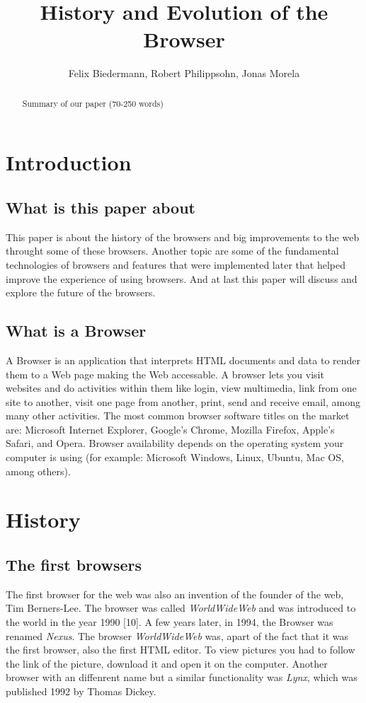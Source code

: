 \documentclass[runningheads]{llncs}
\title{History and Evolution of the Browser}
\author{Felix Biedermann, Robert Philippsohn, Jonas Morela}
\institute{University of Stuttgart, Institute for Architecture of Application Systems \\
Universitätsstraße 38, 70569 Stuttgart, Germany}
\begin{document}
\raggedbottom
\maketitle

	\begin{abstract}
		Summary of our paper (70-250 words)
	\end{abstract}

	\section{Introduction}
		\subsection{What is this paper about}
		This paper is about the history of the browsers and big improvements to the web throught some of these browsers. Another topic are some of the fundamental technologies of browsers and features that were implemented later that helped improve the experience of using browsers. And at last this paper will discuss and explore the future of the browsers.
		\subsection{What is a Browser}
		A Browser is an application that interprets HTML documents and data to render them to a Web page making the Web accessable. A browser lets you visit websites and do activities within them like login, view multimedia, link from one site to another, visit one page from another, print, send and receive email, among many other activities. The most common browser software titles on the market are: Microsoft Internet Explorer, Google's Chrome, Mozilla Firefox, Apple's Safari, and Opera. Browser availability depends on the operating system your computer is using (for example: Microsoft Windows, Linux, Ubuntu, Mac OS, among others).

	\section{History}
		\subsection{The first browsers}
		The first browser for the web was also an invention of the founder of the web, Tim Berners-Lee. The browser was called \textit{WorldWideWeb} and was introduced to the world in the year 1990 [10]. A few years later, in 1994, the Browser was renamed \textit{Nexus}. The browser \textit{WorldWideWeb} was, apart of the fact that it was the first browser, also the first HTML editor.
		To view pictures you had to follow the link of the picture, download it and open it on the computer. Another browser with an diffenrent name but a similar functionality was \textit{Lynx}, which was published 1992 by Thomas Dickey.
\end{document}

